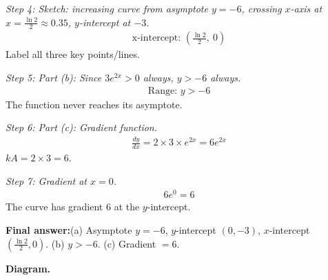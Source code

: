 \documentclass[11pt]{article}
\begin{document}
\textit{Step 4: Sketch: increasing curve from asymptote \( y = -6 \), crossing \( x \)-axis at \( x = \frac{\ln 2}{2} \approx 0.35 \), \( y \)-intercept at \( -3 \).}
\[\begin{gathered}
\text{x-intercept: } \left(\tfrac{\ln 2}{2},\ 0\right)
\end{gathered}\]
Label all three key points/lines.

\textit{Step 5: Part (b): Since \( 3e^{2x} > 0 \) always, \( y > -6 \) always.}
\[\begin{gathered}
\text{Range: } y > -6
\end{gathered}\]
The function never reaches its asymptote.

\textit{Step 6: Part (c): Gradient function.}
\[\begin{gathered}
\frac{dy}{dx} = 2 \times 3 \times e^{2x} = 6e^{2x}
\end{gathered}\]
\( kA = 2 \times 3 = 6 \).

\textit{Step 7: Gradient at \( x = 0 \).}
\[\begin{gathered}
6e^{0} = 6
\end{gathered}\]
The curve has gradient 6 at the \( y \)-intercept.

\begin{answerbox}
\textbf{Final answer:}\quad (a) Asymptote \(\displaystyle  y=-6 \), \(\displaystyle  y \)-intercept \(\displaystyle  (0,-3) \), \(\displaystyle  x \)-intercept \(\displaystyle  \left(\frac{\ln 2}{2}, 0\right) \). (b) \(\displaystyle  y > -6 \). (c) Gradient \(\displaystyle  = 6 \).
\end{answerbox}
\textbf{Diagram.}
\end{document}
